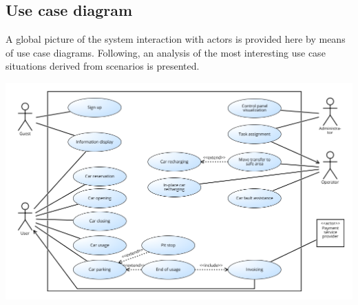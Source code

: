 \subsection{Use case diagram}
	A global picture of the system interaction with actors is provided here by means of use case diagrams. Following, an analysis of the most interesting use case situations derived from scenarios is presented.

	\includegraphics[width=\textwidth]{img/use_case.png}

